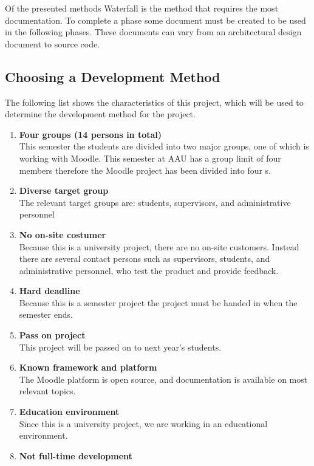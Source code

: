 Of the presented methods Waterfall is the method that requires the most documentation.
To complete a phase some document must be created to be used in the following phases.
These documents can vary from an architectural design document to source code.

\subsection{Choosing a Development Method}
\label{subsec:choosingmethod}
The following list shows the characteristics of this project, which will be used to determine the development method for the project.
\begin{enumerate}
	\item \textbf{Four groups (14 persons in total)} \label{enum:groupSize}\\
	This semester the students are divided into two major groups, one of which is working with Moodle. 
	This semester at AAU has a group limit of four members therefore the Moodle project has been divided into four \subgroup{}s.
	\item \textbf{Diverse target group} \label{enum:targetGroup}\\ 
	The relevant target groups are: students, supervisors, and administrative personnel 
	\item \textbf{No on-site costumer} \label{enum:onsite}\\
	Because this is a university project, there are no on-site customers. 
	Instead there are several contact persons such as supervisors, students, and administrative personnel, who test the product and provide feedback.
	\item \textbf{Hard deadline} \label{enum:deadline}\\
	Because this is a semester project the project must be handed in when the semester ends.
	\item \textbf{Pass on project} \label{enum:passed}\\
	This project will be passed on to next year's students.
	\item \textbf{Known framework and platform} \label{enum:framework}\\
	The Moodle platform is open source, and documentation is available on most relevant topics.
	\item \textbf{Education environment} \label{enum:education}\\
	Since this is a university project, we are working in an educational environment.
	\item \textbf{Not full-time development} \label{enum:halftime}\\

\end{enumerate}
